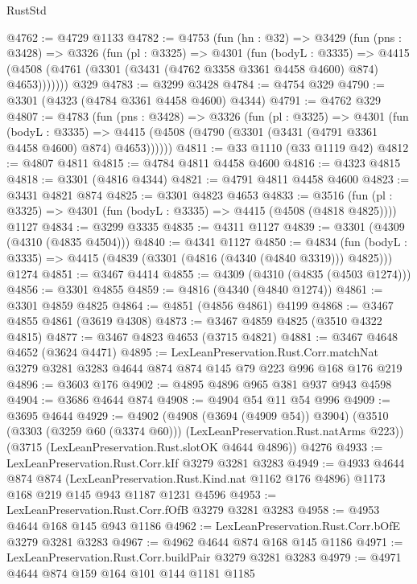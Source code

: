 \begin{lexlean}{RustStd}
\begin{coremodule}
@4762 := @4729 @1133
@4782 := @4753
    (fun (hn : @32) =>
    @3429
      (fun (pns : @3428) =>
      @3326
        (fun (pl : @3325) =>
        @4301
          (fun (bodyL : @3335) =>
          @4415 (@4508 (@4761 (@3301 (@3431 (@4762 @3358 @3361 @4458 @4600) @874) @4653)))))))
    @329
@4783 := @3299 @3428
@4784 := @4754 @329
@4790 := @3301 (@4323 (@4784 @3361 @4458 @4600) @4344)
@4791 := @4762 @329
@4807 := @4783
    (fun (pns : @3428) =>
    @3326
      (fun (pl : @3325) =>
      @4301
        (fun (bodyL : @3335) =>
        @4415 (@4508 (@4790 (@3301 (@3431 (@4791 @3361 @4458 @4600) @874) @4653))))))
@4811 := @33 @1110 (@33 @1119 @42)
@4812 := @4807 @4811
@4815 := @4784 @4811 @4458 @4600
@4816 := @4323 @4815
@4818 := @3301 (@4816 @4344)
@4821 := @4791 @4811 @4458 @4600
@4823 := @3431 @4821 @874
@4825 := @3301 @4823 @4653
@4833 := @3516
    (fun (pl : @3325) => @4301 (fun (bodyL : @3335) => @4415 (@4508 (@4818 @4825))))
    @1127
@4834 := @3299 @3335
@4835 := @4311 @1127
@4839 := @3301 (@4309 (@4310 (@4835 @4504)))
@4840 := @4341 @1127
@4850 := @4834
    (fun (bodyL : @3335) => @4415 (@4839 (@3301 (@4816 (@4340 (@4840 @3319))) @4825)))
    @1274
@4851 := @3467 @4414
@4855 := @4309 (@4310 (@4835 (@4503 @1274)))
@4856 := @3301 @4855
@4859 := @4816 (@4340 (@4840 @1274))
@4861 := @3301 @4859 @4825
@4864 := @4851 (@4856 @4861) @4199
@4868 := @3467 @4855 @4861 (@3619 @4308)
@4873 := @3467 @4859 @4825 (@3510 @4322 @4815)
@4877 := @3467 @4823 @4653 (@3715 @4821)
@4881 := @3467 @4648 @4652 (@3624 @4471)
@4895 := LexLeanPreservation.Rust.Corr.matchNat
    @3279
    @3281
    @3283
    @4644
    @874
    @874
    @145
    @79
    @223
    @996
    @168
    @176
    @219
@4896 := @3603 @176
@4902 := @4895 @4896 @965 @381 @937 @943 @4598
@4904 := @3686 @4644 @874
@4908 := @4904 @54 @11 @54 @996
@4909 := @3695 @4644
@4929 := @4902
    (@4908 (@3694 (@4909 @54)) @3904)
    (@3510 (@3303 (@3259 @60 (@3374 @60))) (LexLeanPreservation.Rust.natArms @223))
    (@3715 (LexLeanPreservation.Rust.slotOK @4644 @4896))
    @4276
@4933 := LexLeanPreservation.Rust.Corr.kIf @3279 @3281 @3283
@4949 := @4933
    @4644
    @874
    @874
    (LexLeanPreservation.Rust.Kind.nat @1162 @176 @4896)
    @1173
    @168
    @219
    @145
    @943
    @1187
    @1231
    @4596
@4953 := LexLeanPreservation.Rust.Corr.fOfB @3279 @3281 @3283
@4958 := @4953 @4644 @168 @145 @943 @1186
@4962 := LexLeanPreservation.Rust.Corr.bOfE @3279 @3281 @3283
@4967 := @4962 @4644 @874 @168 @145 @1186
@4971 := LexLeanPreservation.Rust.Corr.buildPair @3279 @3281 @3283
@4979 := @4971 @4644 @874 @159 @164 @101 @144 @1181 @1185

\end{coremodule}
\end{lexlean}
